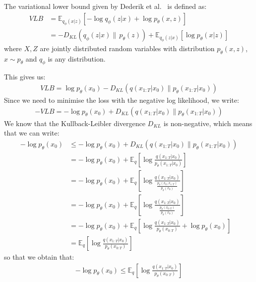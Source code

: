 \documentclass[twoside]{article}
\numberwithin{equation}{section}
\numberwithin{figure}{section}
\begin{document}
The variational lower bound given by Dederik et al.~\cite{kingma2022autoencoding} is defined as:
\begin{align}
  VLB &= \mathbb{E}_{q_\phi (x | z)} \left[ - \log q_\phi (z | x) + \log p_\theta(x, z) \right] \\[10pt]
  &= - D_{KL} (q_\phi (z | x) \| \, p_\theta (z)) + \mathbb{E}_{q_\phi (z | x)} \left[ \log p_\theta (x | z) \right]
\end{align}
where $X, Z$ are jointly distributed random variables with distribution $p_\theta (x, z)$, $x \sim p_\theta$ and $q_\phi$ is any distribution.

This gives us:
\begin{gather}
  VLB = \log p_{\theta}\left(x_0\right) - D_{KL}\left(q\left(x_{1:T}|x_0\right) \| p_{\theta}\left(x_{1:T}|x_0\right)\right)
\end{gather}
Since we need to minimise the loss with the negative log likelihood, we write:
\begin{gather}
  - VLB = - \log p_{\theta}\left(x_0\right) + D_{KL}\left(q\left(x_{1:T}|x_0\right) \| p_{\theta}\left(x_{1:T}|x_0\right)\right)
\end{gather}
We know that the Kullback-Leibler divergence $D_{KL}$ is non-negative, which means that we can write:
\begin{align}
  - \log p_{\theta}\left(x_0\right) &\leq - \log p_{\theta}\left(x_0\right) + D_{KL}\left(q\left(x_{1:T}|x_0\right) \| p_{\theta}\left(x_{1:T}|x_0\right)\right) \\[10pt]
  &= - \log p_{\theta}\left(x_0\right) + \mathbb{E}_q \left[\log \frac{q\left(x_{1:T}|x_0\right)}{p_{\theta}\left(x_{1:T}|x_0\right)}\right] \\[10pt]
  &= - \log p_{\theta}\left(x_0\right) + \mathbb{E}_q \left[\log \frac{q\left(x_{1:T}|x_0\right)}{\frac{p_{\theta}\left(x_0, x_{1:T}\right)}{p_{\theta}\left(x_0\right)}}\right] \\[10pt]
  &= - \log p_{\theta}\left(x_0\right) + \mathbb{E}_q \left[\log \frac{q\left(x_{1:T}|x_0\right)}{\frac{p_{\theta}\left(x_{0:T}\right)}{p_{\theta}\left(x_0\right)}}\right] \\[10pt]
  &= - \log p_{\theta}\left(x_0\right) + \mathbb{E}_q \left[\log \frac{q\left(x_{1:T}|x_0\right)}{p_{\theta}\left(x_{0:T}\right)} + \log {p_{\theta}\left(x_0\right)}\right] \\[10pt]
  &= \mathbb{E}_q \left[\log \frac{q\left(x_{1:T}|x_0\right)}{p_{\theta}\left(x_{0:T}\right)}\right]
\end{align}
so that we obtain that:
\begin{align}
  - \log p_{\theta}\left(x_0\right) \leq \mathbb{E}_q \left[\log \frac{q\left(x_{1:T}|x_0\right)}{p_{\theta}\left(x_{0:T}\right)}\right]
\end{align}
\end{document}
